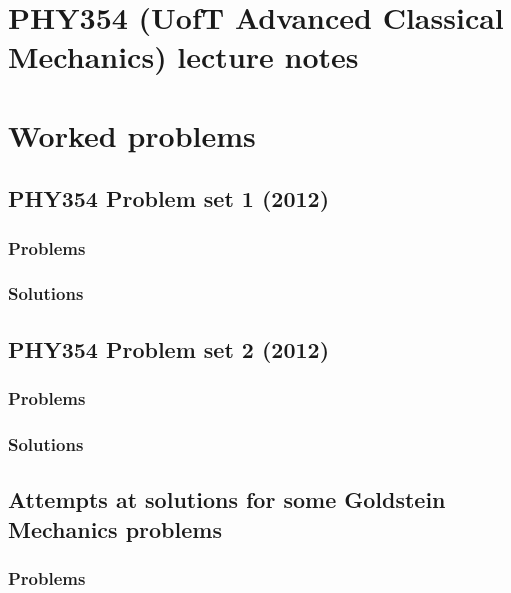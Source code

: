 \part{PHY354 (UofT Advanced Classical Mechanics) lecture notes}
   
   
   
   
   

\part{Worked problems}
   \chapter{PHY354 Problem set 1 (2012)}
      \section{Problems}
         
      \section{Solutions}
         \shipoutAnswer
   \chapter{PHY354 Problem set 2 (2012)}
      \section{Problems}
         
      \section{Solutions}
         \shipoutAnswer
   \chapter{Attempts at solutions for some Goldstein Mechanics problems}
      \section{Problems}
          
